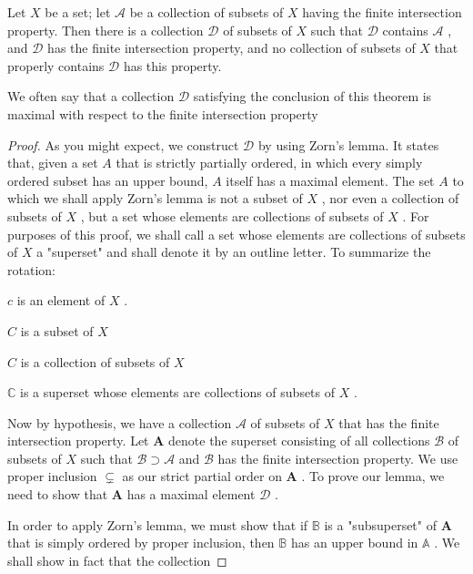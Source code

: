 \begin{lemma} Let \(X\) be a set; let \(\mathcal{A}\) be a collection of subsets of \(X\) having the finite intersection property. Then there is a collection \(\mathcal{D}\) of subsets of \(X\) such that \(\mathcal{D}\) contains \(\mathcal{A}\) , and \(\mathcal{D}\) has the finite intersection property, and no collection of subsets of \(X\) that properly contains \(\mathcal{D}\) has this property.
\end{lemma}

We often say that a collection \(\mathcal{D}\) satisfying the conclusion of this theorem is maximal with respect to the finite intersection property

\begin{proof}As you might expect, we construct \(\mathcal{D}\) by using Zorn’s lemma. It states that, given a set \(A\) that is strictly partially ordered, in which every simply ordered subset has an upper bound, \(A\) itself has a maximal element.
The set \(A\) to which we shall apply Zorn’s lemma is not a subset of \(X\) , nor even a collection of subsets of \(X\) , but a set whose elements are collections of subsets of \(X\) . For purposes of this proof, we shall call a set whose elements are collections of subsets of \(X\) a "superset" and shall denote it by an outline letter. To summarize the rotation:

\(c\) is an element of \(X\) .

\(C\) is a subset of \(X\)

\(C\) is a collection of subsets of \(X\)

\(\mathbb{C}\) is a superset whose elements are collections of subsets of \(X\) .

Now by hypothesis, we have a collection \(\mathcal{A}\) of subsets of \(X\) that has the finite intersection property. Let \(\mathbf{A}\) denote the superset consisting of all collections \(\mathcal{B}\) of subsets of \(X\) such that \(\mathcal{B} \supset  \mathcal{A}\) and \(\mathcal{B}\) has the finite intersection property. We use proper inclusion \(\subsetneq\) as our strict partial order on \(\mathbf{A}\) . To prove our lemma, we need to show that \(\mathbf{A}\) has a maximal element \(\mathcal{D}\) .

In order to apply Zorn’s lemma, we must show that if \(\mathbb{B}\) is a "subsuperset" of \(\mathbf{A}\) that is simply ordered by proper inclusion, then \(\mathbb{B}\) has an upper bound in \(\mathbb{A}\) . We shall show in fact that the collection


\end{proof}
